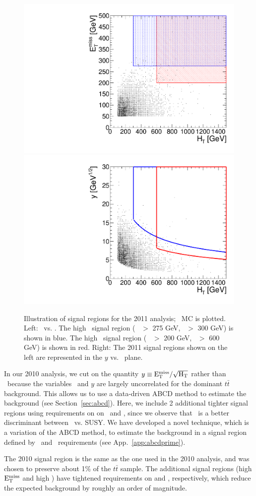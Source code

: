 \begin{figure}[hbt]
\begin{center}
\includegraphics[width=0.48\linewidth]{plots/sigregions_met_ht_tt.pdf}
\includegraphics[width=0.48\linewidth]{plots/sigregions_y_ht_tt.pdf}
\caption{\label{fig:sigRegion}\protect
Illustration of signal regions for the 2011 analysis; \ttbar \, MC is plotted. 
Left: \met\ vs. \Ht. The high \met\ signal region ( \met\ $>$ 275 GeV, \Ht\ $>$ 300 GeV)
is shown in blue. The high \Ht\ signal region ( \met\ $>$ 200 GeV, \Ht\ $>$ 600 GeV) is
shown in red. Right: The 2011 signal regions shown on the left are represented in 
the $y$ vs. \Ht\ plane.  
}
\end{center}
\end{figure}

In our 2010 analysis, we cut on the quantity $y \equiv \rm E_{T}^{miss}/\sqrt{H_T}$ rather than \met\
because the variables \Ht\ and $y$ are
largely uncorrelated for the dominant $t\bar{t}$ background.  
This allows us to use a data-driven ABCD method to estimate the
background (see Section~\ref{sec:abcd}). Here, we include 2 additional tighter signal
regions using requirements on on \met\ and \Ht, since we observe that \met\ is a better 
discriminant between \ttbar\ vs. SUSY. We have developed a novel technique, which is a 
variation of the ABCD method, to estimate the background in a signal region defined by
\met\ and \Ht\ requirements (see App.~\ref{app:abcdprime}).

The 2010 signal region is the same as the one used in the 2010 analysis, and was
chosen to preserve about 1\% of the $t\bar{t}$ sample.
The additional signal regions (high $\rm E_{T}^{miss}$ and high \Ht) have tightened requirements
on \met and \Ht, respectively, which reduce the expected background by roughly
an order of magnitude.

